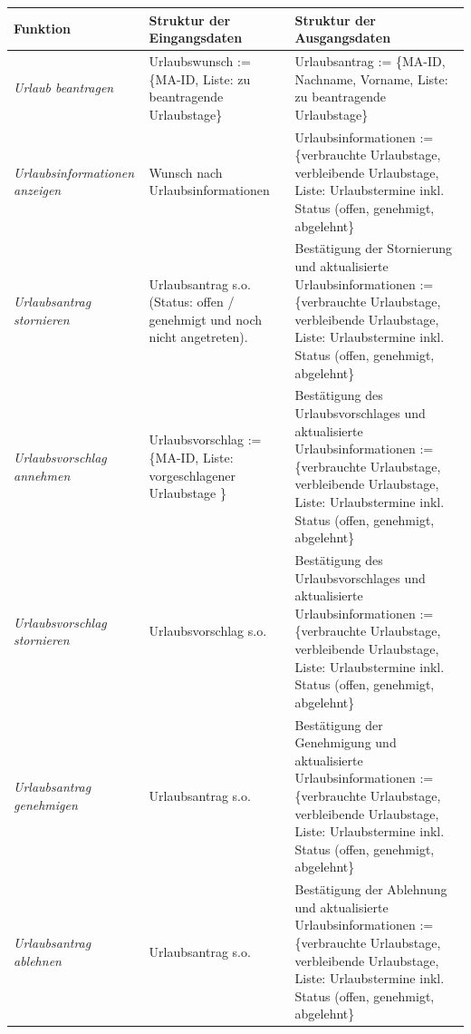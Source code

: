 \newpage
{
\hspace{-2cm}
\footnotesize
\begin{tabular}{|p{3cm}|p{6cm}|p{6cm}|}
	\hline
		\textbf{Funktion	} &
		\textbf{Struktur der Eingangsdaten} &
		\textbf{Struktur der Ausgangsdaten} \\
	\hline \hline
	\textit{Urlaub beantragen} &
		Urlaubswunsch := \{MA-ID, Liste: zu beantragende Urlaubstage\}&
		Urlaubsantrag := \{MA-ID, Nachname, Vorname, Liste: zu beantragende Urlaubstage\}\\
	\hline
		\textit{Urlaubsinformationen anzeigen} &
		Wunsch nach Urlaubsinformationen &
		Urlaubsinformationen := \{verbrauchte Urlaubstage, verbleibende Urlaubstage, Liste: Urlaubstermine inkl. Status (offen, genehmigt, abgelehnt\}\\
	\hline
		\textit{Urlaubsantrag \newline stornieren} &
		Urlaubsantrag s.o. (Status: offen / genehmigt und noch nicht angetreten).&
		Bestätigung der Stornierung und aktualisierte Urlaubsinformationen := \{verbrauchte Urlaubstage, verbleibende Urlaubstage, Liste: Urlaubstermine inkl. Status (offen, genehmigt, abgelehnt\}\\
	\hline
		\textit{Urlaubsvorschlag \newline annehmen} &
		Urlaubsvorschlag := \{MA-ID, Liste: vorgeschlagener Urlaubstage \}&
		Bestätigung des Urlaubsvorschlages und aktualisierte Urlaubsinformationen := \{verbrauchte Urlaubstage, verbleibende Urlaubstage, Liste: Urlaubstermine inkl. Status (offen, genehmigt, abgelehnt\}\\
	\hline
		\textit{Urlaubsvorschlag \newline stornieren} &
		Urlaubsvorschlag s.o.&
		Bestätigung des Urlaubsvorschlages und aktualisierte Urlaubsinformationen := \{verbrauchte Urlaubstage, verbleibende Urlaubstage, Liste: Urlaubstermine inkl. Status (offen, genehmigt, abgelehnt\}\\
	\hline
	\hline
		\textit{Urlaubsantrag \newline genehmigen} &
		Urlaubsantrag s.o. &
		Bestätigung der Genehmigung und aktualisierte Urlaubsinformationen := \{verbrauchte Urlaubstage, verbleibende Urlaubstage, Liste: Urlaubstermine inkl. Status (offen, genehmigt, abgelehnt\}\\
	\hline
		\textit{Urlaubsantrag \newline ablehnen} &
		Urlaubsantrag s.o. &
		Bestätigung der Ablehnung und aktualisierte Urlaubsinformationen := \{verbrauchte Urlaubstage, verbleibende Urlaubstage, Liste: Urlaubstermine inkl. Status (offen, genehmigt, abgelehnt\}\\

\end{tabular}}
